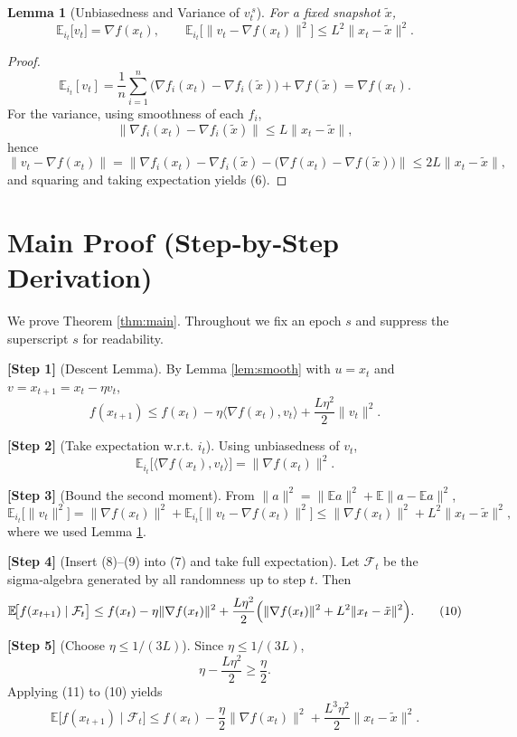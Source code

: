 \documentclass{article}
\newtheorem{lemma}{Lemma}
\newcommand{\EE}{\mathbb{E}}
\newcommand{\grad}{\nabla}
\begin{document}
\begin{lemma}[Unbiasedness and Variance of $v_t^{\,s}$]\label{lem:unbiased}
For a fixed snapshot $\tilde{x}$,
\[
\EE_{i_t}\!\bigl[v_t\bigr]=\grad f(x_t),\qquad
\EE_{i_t}\!\bigl[\|v_t-\grad f(x_t)\|^{2}\bigr]
\le L^{2}\|x_t-\tilde{x}\|^{2}.
\tag{6}
\]
\end{lemma}
\begin{proof}
\[
\EE_{i_t}[v_t]=\frac{1}{n}\sum_{i=1}^{n}\bigl(\grad f_i(x_t)-\grad f_i(\tilde{x})\bigr)+\grad f(\tilde{x})
      =\grad f(x_t).
\]
For the variance, using smoothness of each $f_i$,
\[
\|\grad f_i(x_t)-\grad f_i(\tilde{x})\|
    \le L\|x_t-\tilde{x}\|,
\]
hence
\[
\|v_t-\grad f(x_t)\|
    =\bigl\|\grad f_i(x_t)-\grad f_i(\tilde{x})-\bigl(\grad f(x_t)-\grad f(\tilde{x})\bigr)\bigr\|
    \le 2L\|x_t-\tilde{x}\|,
\]
and squaring and taking expectation yields (6). \qedhere
\end{proof}

\section*{Main Proof (Step‑by‑Step Derivation)}
We prove Theorem \ref{thm:main}. Throughout we fix an epoch $s$ and suppress the superscript $s$ for readability.

\noindent\textbf{[Step 1]} (Descent Lemma). By Lemma \ref{lem:smooth} with $u=x_t$ and $v=x_{t+1}=x_t-\eta v_t$,
\[
f(x_{t+1})\le f(x_t)-\eta\langle\grad f(x_t),v_t\rangle+\frac{L\eta^{2}}{2}\|v_t\|^{2}.
\tag{7}
\]

\noindent\textbf{[Step 2]} (Take expectation w.r.t. $i_t$). Using unbiasedness of $v_t$,
\[
\EE_{i_t}\!\bigl[\langle\grad f(x_t),v_t\rangle\bigr]
    =\|\grad f(x_t)\|^{2}.
\tag{8}
\]

\noindent\textbf{[Step 3]} (Bound the second moment). From $\|a\|^{2}= \|\EE a\|^{2}+\EE\|a-\EE a\|^{2}$,
\[
\EE_{i_t}\!\bigl[\|v_t\|^{2}\bigr]
    =\|\grad f(x_t)\|^{2}+ \EE_{i_t}\!\bigl[\|v_t-\grad f(x_t)\|^{2}\bigr]
    \le\|\grad f(x_t)\|^{2}+L^{2}\|x_t-\tilde{x}\|^{2},
\tag{9}
\]
where we used Lemma \ref{lem:unbiased}.

\noindent\textbf{[Step 4]} (Insert (8)–(9) into (7) and take full expectation). Let $\mathcal{F}_t$ be the sigma‑algebra generated by all randomness up to step $t$. Then
\[
\EE\!\bigl[f(x_{t+1})\mid\mathcal{F}_t\bigr]
\le f(x_t)-\eta\|\grad f(x_t)\|^{2}
      +\frac{L\eta^{2}}{2}\Bigl(\|\grad f(x_t)\|^{2}+L^{2}\|x_t-\tilde{x}\|^{2}\Bigr).
\tag{10}
\]

\noindent\textbf{[Step 5]} (Choose $\eta\le 1/(3L)$). Since $\eta\le 1/(3L)$,
\[
\eta-\frac{L\eta^{2}}{2}\ge \frac{\eta}{2}.
\tag{11}
\]
Applying (11) to (10) yields
\[
\EE\!\bigl[f(x_{t+1})\mid\mathcal{F}_t\bigr]
\le f(x_t)-\frac{\eta}{2}\|\grad f(x_t)\|^{2}
      +\frac{L^{3}\eta^{2}}{2}\|x_t-\tilde{x}\|^{2}.
\tag{12}
\]
\end{document}
